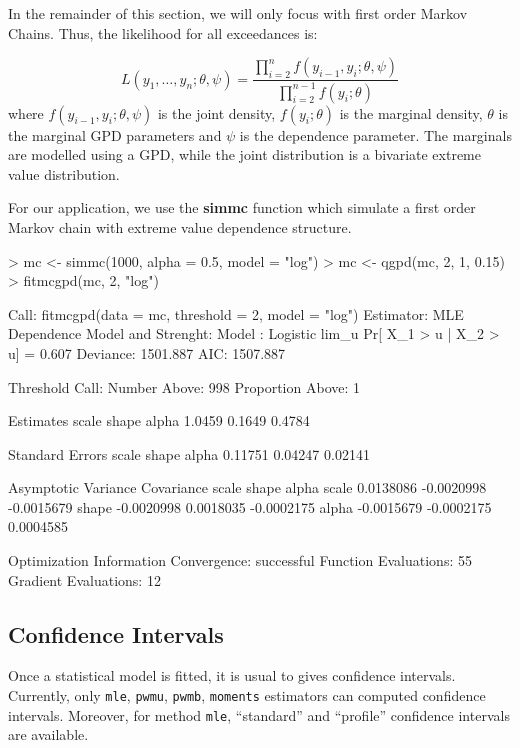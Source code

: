 \documentclass[a4paper]{article}
\numberwithin{equation}{section}
\theoremstyle{definition}
\begin{document}
In the remainder of this section, we will only focus with first order
Markov Chains. Thus, the likelihood for all exceedances is:

\begin{equation}
  \label{eq:likMC}
  L(y_1, \ldots, y_n; \theta, \psi) = \frac{\prod_{i=2}^n
    f(y_{i-1},y_i;\theta, \psi)} {\prod_{i=2}^{n-1} f(y_i;\theta)}
\end{equation}
where $f(y_{i-1},y_i;\theta, \psi)$ is the joint density,
$f(y_i;\theta)$ is the marginal density, $\theta$ is the marginal GPD
parameters and $\psi$ is the dependence parameter. The marginals are
modelled using a GPD, while the joint distribution is a bivariate
extreme value distribution.

For our application, we use the \textbf{simmc} function which simulate
a first order Markov chain with extreme value dependence structure.
\begin{Schunk}
\begin{Sinput}
> mc <- simmc(1000, alpha = 0.5, model = "log")
> mc <- qgpd(mc, 2, 1, 0.15)
> fitmcgpd(mc, 2, "log")
\end{Sinput}
\begin{Soutput}
Call: fitmcgpd(data = mc, threshold = 2, model = "log") 
Estimator: MLE 
Dependence Model and Strenght:
	Model : Logistic 
	lim_u Pr[ X_1 > u | X_2 > u] = 0.607 
Deviance: 1501.887 
     AIC: 1507.887 

Threshold Call: 
Number Above: 998 
Proportion Above: 1 

Estimates
 scale   shape   alpha  
1.0459  0.1649  0.4784  

Standard Errors
  scale    shape    alpha  
0.11751  0.04247  0.02141  

Asymptotic Variance Covariance
       scale       shape       alpha     
scale   0.0138086  -0.0020998  -0.0015679
shape  -0.0020998   0.0018035  -0.0002175
alpha  -0.0015679  -0.0002175   0.0004585

Optimization Information
  Convergence: successful 
  Function Evaluations: 55 
  Gradient Evaluations: 12 
\end{Soutput}
\end{Schunk}


\subsection{Confidence Intervals}
\label{subsec:confInt}

Once a statistical model is fitted, it is usual to gives confidence
intervals. Currently, only \verb|mle|, \verb|pwmu|, \verb|pwmb|,
\verb|moments| estimators can computed confidence intervals. Moreover,
for method \verb|mle|, ``standard'' and ``profile'' confidence
intervals are available.
\end{document}
